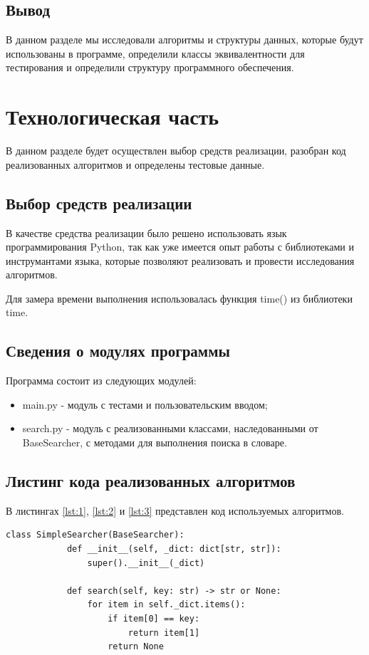 \documentclass[12pt]{report}
\begin{document}
	\section{Вывод}
	В данном разделе мы исследовали алгоритмы и структуры данных, которые будут использованы в программе,
	определили классы эквивалентности для тестирования и определили структуру программного обеспечения.
	
	\chapter{Технологическая часть}
	В данном разделе будет осуществлен выбор средств реализации,
	разобран код реализованных алгоритмов и определены тестовые данные.
	
	\section{Выбор средств реализации}
	В качестве средства реализации было решено использовать язык программирования Python, так как уже имеется опыт работы с библиотеками и инструмантами языка, которые позволяют реализовать и провести исследования алгоритмов.
	
	Для замера времени выполнения использовалась функция time() из библиотеки time.
	
	\section{Сведения о модулях программы}
	Программа состоит из следующих модулей:
	\begin{itemize}
		\item main.py - модуль с тестами и пользовательским вводом;
		\item search.py - модуль с реализованными классами, наследованными от BaseSearcher, с методами для выполнения поиска в словаре.
	\end{itemize}
	
	\newpage
	\section{Листинг кода реализованных алгоритмов}
	
	В листингах \ref{lst:1}, \ref{lst:2} и \ref{lst:3} представлен код используемых алгоритмов.
	
	\begin{lstlisting}[label={lst:1},caption= Алгоритм полного перебора.]
		class SimpleSearcher(BaseSearcher):
			def __init__(self, _dict: dict[str, str]):
				super().__init__(_dict)
			
			def search(self, key: str) -> str or None:
				for item in self._dict.items():
					if item[0] == key:
						return item[1]
					return None
	\end{lstlisting}
	
\end{document}
